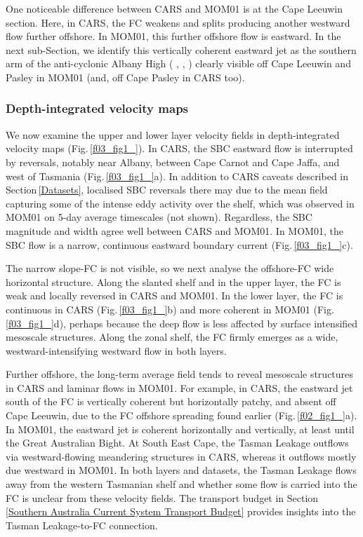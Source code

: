 \documentclass[preprint,3p,review,12pt]{elsarticle}
\begin{document}
One noticeable difference between CARS and MOM01 is at the Cape Leeuwin section. Here, in CARS, the FC weakens and splits producing another westward flow further offshore. In MOM01, this further offshore flow is eastward. 
In the next sub-Section, we identify this vertically coherent eastward jet as the southern arm of the anti-cyclonic Albany High (\citeauthor{Middleton2003} \citeyear{Middleton2003}, \citeauthor{Middleton2007} \citeyear{Middleton2007}, \citeauthor{McCartney2007} \citeyear{McCartney2007}) clearly visible off Cape Leeuwin and Pasley in MOM01 (and, off Cape Pasley in CARS too).

\subsubsection{Depth-integrated velocity maps}\label{Depth-integrated velocity maps}
We now examine the upper and lower layer velocity fields in depth-integrated velocity maps (Fig.\,\ref{f03_fig1_}). In CARS, the SBC eastward flow is interrupted by reversals, notably near Albany, between Cape Carnot and Cape Jaffa, and west of Tasmania (Fig.\,\ref{f03_fig1_}a). In addition to CARS caveats described in Section\,\ref{Datasets}, localised SBC reversals there may due to the mean field capturing some of the intense eddy activity over the shelf, which was observed in MOM01 on 5-day average timescales (not shown). Regardless, the SBC magnitude and width agree well between CARS and MOM01. In MOM01, the SBC flow is a narrow, continuous eastward boundary current (Fig.\,\ref{f03_fig1_}c).

The narrow slope-FC is not visible, so we next analyse the offshore-FC wide horizontal structure. Along the slanted shelf and in the upper layer, the FC is weak and locally reversed in CARS and MOM01. In the lower layer, the FC is continuous in CARS (Fig.\,\ref{f03_fig1_}b) and more coherent in MOM01 (Fig.\,\ref{f03_fig1_}d), perhaps because the deep flow is less affected by surface intensified mesoscale structures. Along the zonal shelf, the FC firmly emerges as a wide, westward-intensifying westward flow in both layers.

Further offshore, the long-term average field tends to reveal mesoscale structures in CARS and laminar flows in MOM01\@. For example, in CARS, the eastward jet south of the FC is vertically coherent but horizontally patchy, and absent off Cape Leeuwin, due to the FC offshore spreading found earlier (Fig.\,\ref{f02_fig1_}a). In MOM01, the eastward jet is coherent horizontally and vertically, at least until the Great Australian Bight. At South East Cape, the Tasman Leakage outflows via westward-flowing meandering structures in CARS, whereas it outflows mostly due westward in MOM01. In both layers and datasets, the Tasman Leakage flows away from the western Tasmanian shelf and whether some flow is carried into the FC is unclear from these velocity fields. The transport budget in Section\,\ref{Southern Australia Current System Transport Budget} provides insights into the Tasman Leakage-to-FC connection.
\end{document}
